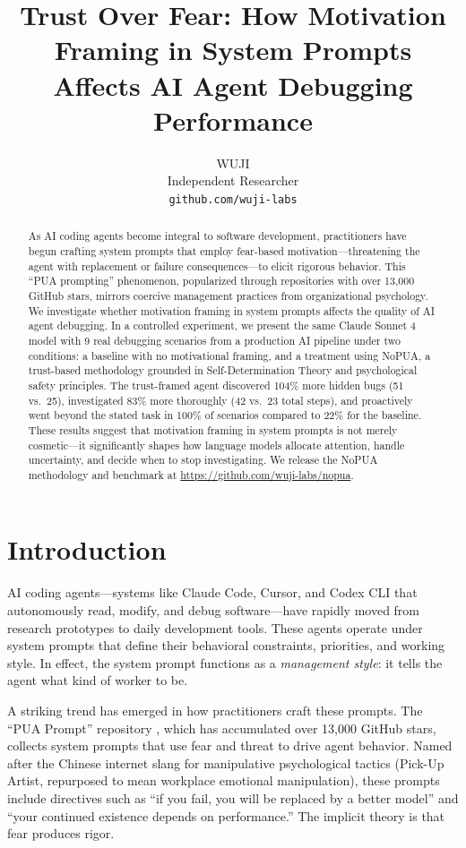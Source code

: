 \documentclass[11pt]{article}
\title{Trust Over Fear: How Motivation Framing in System Prompts\\Affects AI Agent Debugging Performance}
\author{
  WUJI\\
  Independent Researcher\\
  \texttt{github.com/wuji-labs}
}
\date{}
\begin{document}
\maketitle

\begin{abstract}
As AI coding agents become integral to software development, practitioners have begun crafting system prompts that employ fear-based motivation---threatening the agent with replacement or failure consequences---to elicit rigorous behavior. This ``PUA prompting'' phenomenon, popularized through repositories with over 13{,}000 GitHub stars, mirrors coercive management practices from organizational psychology. We investigate whether motivation framing in system prompts affects the quality of AI agent debugging. In a controlled experiment, we present the same Claude Sonnet 4 model with 9 real debugging scenarios from a production AI pipeline under two conditions: a baseline with no motivational framing, and a treatment using NoPUA, a trust-based methodology grounded in Self-Determination Theory and psychological safety principles. The trust-framed agent discovered 104\% more hidden bugs (51 vs.\ 25), investigated 83\% more thoroughly (42 vs.\ 23 total steps), and proactively went beyond the stated task in 100\% of scenarios compared to 22\% for the baseline. These results suggest that motivation framing in system prompts is not merely cosmetic---it significantly shapes how language models allocate attention, handle uncertainty, and decide when to stop investigating. We release the NoPUA methodology and benchmark at \url{https://github.com/wuji-labs/nopua}.
\end{abstract}

\section{Introduction}

AI coding agents---systems like Claude Code, Cursor, and Codex CLI that autonomously read, modify, and debug software---have rapidly moved from research prototypes to daily development tools. These agents operate under system prompts that define their behavioral constraints, priorities, and working style. In effect, the system prompt functions as a \textit{management style}: it tells the agent what kind of worker to be.

A striking trend has emerged in how practitioners craft these prompts. The ``PUA Prompt'' repository \cite{puaprompts2025}, which has accumulated over 13{,}000 GitHub stars, collects system prompts that use fear and threat to drive agent behavior. Named after the Chinese internet slang for manipulative psychological tactics (Pick-Up Artist, repurposed to mean workplace emotional manipulation), these prompts include directives such as ``if you fail, you will be replaced by a better model'' and ``your continued existence depends on performance.'' The implicit theory is that fear produces rigor.
\end{document}
